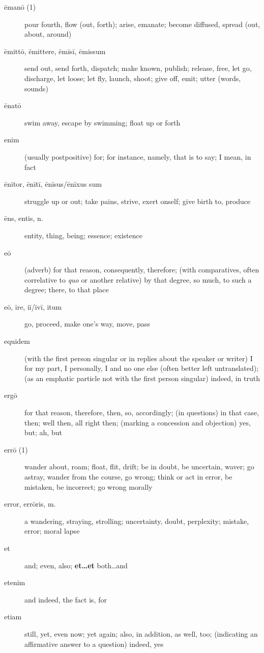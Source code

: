 \begin{description}
    \item[ēmanō (1)] pour fourth, flow (out, forth); arise, emanate; become diffused, spread (out, about, around)
    \item[ēmittō, ēmittere, ēmīsī, ēmissum] \marginnote{*}send out, send forth, dispatch; make known, publish; release, free, let go, discharge, let loose; let fly, launch, shoot; give off, emit; utter (words, sounds)
    \item[ēnatō] swim away, escape by swimming; float up or forth
    \item[enim] \marginnote{*}(usually postpositive) for; for instance, namely, that is to say; I mean, in fact
    \item[ēnītor, ēnītī, ēnīsus/ēnīxus sum] struggle up or out; take pains, strive, exert onself; give birth to, produce
    \item[ēns, entis, n.] entity, thing, being; essence; existence
    \item[eō] \marginnote{*}(adverb) for that reason, consequently, therefore; (with comparatives, often correlative to \textit{quo} or another relative) by that degree, so much, to such a degree; there, to that place
    \item[eō, īre, iī/īvī, itum] \marginnote{*}go, proceed, make one's way, move, pass
    \item[equidem] (with the first person singular or in replies about the speaker or writer) I for my part, I personally, I and no one else (often better left untranslated); (as an emphatic particle not with the first person singular) indeed, in truth
    \item[ergō] \marginnote{*}for that reason, therefore, then, so, accordingly; (in questions) in that case, then; well then, all right then; (marking a concession and objection) yes, but; ah, but
    \item[errō (1)] \marginnote{*}wander about, roam; float, flit, drift; be in doubt, be uncertain, waver; go astray, wander from the course, go wrong; think or act in error, be mistaken, be incorrect; go wrong morally
    \item[error, errōris, m.] \marginnote{*}a wandering, straying, strolling; uncertainty, doubt, perplexity; mistake, error; moral lapse
    \item[et] \marginnote{*}and; even, also; \textbf{et\dots et} both\dots and
    \item[etenim] and indeed, the fact is, for
    \item[etiam] \marginnote{*}still, yet, even now; yet again; also, in addition, as well, too; (indicating an affirmative answer to a question) indeed, yes

\end{description}
